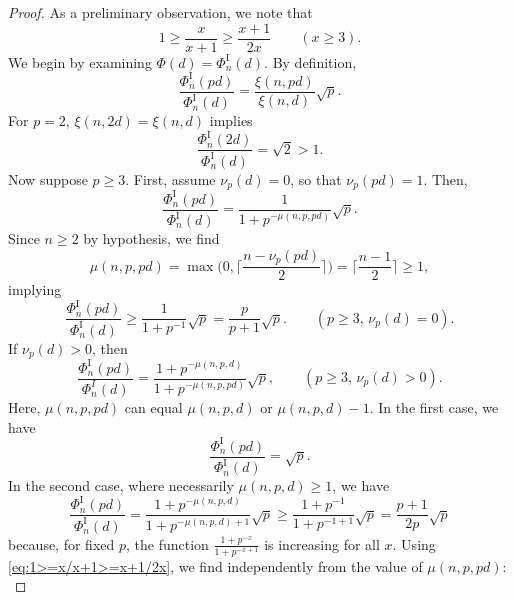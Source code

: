 \documentclass[a4paper]{amsart}
\theoremstyle{definition}
\theoremstyle{plain}
\newcommand{\I}{\mathrm{I}}
\begin{document}
\begin{proof}
    As a preliminary observation, we note that
    \begin{equation} \label{eq:1>=x/x+1>=x+1/2x}
        1 \geq \frac{x}{x+1} \geq \frac{x+1}{2x} \qquad (x \geq 3).
    \end{equation}
    We begin by examining \(\Phi(d) = \Phi^\I_n(d)\). By definition,
    \begin{equation*}
        \frac{\Phi_n^\I(pd)}{\Phi_n^\I(d)} = \frac{\xi(n,pd)}{\xi(n,d)} \sqrt{p}.
    \end{equation*}
    For \(p = 2\), \(\xi(n,2d) = \xi(n,d)\) implies
    \begin{equation} \label{eq:PhiI.p=2}
        \frac{\Phi_n^\I(2d)}{\Phi_n^\I(d)} = \sqrt{2} > 1.
    \end{equation}
    Now suppose \(p \geq 3\). First, assume \(\nu_p(d) = 0\), so that \(\nu_p(pd) = 1\). Then, 
    \begin{equation*}
        \frac{\Phi_n^\I(pd)}{\Phi_n^\I(d)} = \frac{1}{1+p^{-\mu(n,p,pd)}}\sqrt{p}.
    \end{equation*}
    Since \(n \geq 2\) by hypothesis, we find 
    \[
        \mu(n,p,pd) = \max\Big(0, \Big\lceil \frac{n-\nu_p(pd)}{2} \Big\rceil\Big) = \Big\lceil \frac{n-1}{2} \Big\rceil \geq 1,
    \]
    implying
    \begin{equation} \label{eq:PhiI.p>=3,nup(d)=0}
        \frac{\Phi_n^\I(pd)}{\Phi_n^\I(d)} \geq \frac{1}{1+p^{-1}} \sqrt{p}  = \frac{p}{p+1} \sqrt{p}. \qquad (p \geq 3, \, \nu_p(d) = 0).
    \end{equation}
    If \(\nu_p(d) > 0\), then
    \begin{equation} \label{eq:PhiI.p>=3,nu>0(a)}
        \frac{\Phi_n^\I(pd)}{\Phi^I_n(d)} = \frac{1+p^{-\mu(n,p,d)}}{1+p^{-\mu(n,p,pd)}} \sqrt{p}, \qquad (p \geq 3, \, \nu_p(d) > 0).
    \end{equation}
    Here, \(\mu(n,p,pd)\) can equal \(\mu(n,p,d)\) or \(\mu(n,p,d)-1\). In the first case, we have
    \[
        \frac{\Phi_n^\I(pd)}{\Phi_n^\I(d)} = \sqrt{p}. 
    \]
    In the second case, where necessarily \(\mu(n,p,d) \geq 1\), we have 
    \[
        \frac{\Phi_n^\I(pd)}{\Phi_n^\I(d)} = \frac{1+p^{-\mu(n,p,d)}}{1+p^{-\mu(n,p,d)+1}} \sqrt{p} \geq \frac{1+p^{-1}}{1+p^{-1+1}} \sqrt{p} = \frac{p+1}{2p} \sqrt{p} 
    \]
    because, for fixed \(p\), the function
    \(
        \frac{1+p^{-x}}{1+p^{-x+1}}
    \)
    is increasing for all \(x\). Using \eqref{eq:1>=x/x+1>=x+1/2x}, we find independently from the value of \(\mu(n,p,pd)\):
    \begin{equation} \label{eq:PhiI.p>=3,nup(d)>0}

\end{equation}
\end{proof}
\end{document}
